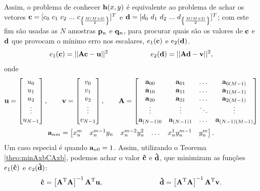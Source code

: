 \begin{theorem}
Assim, o problema de conhecer $\VECTOR{h}(x,y)$ é equivalente ao 
problema de achar os vetores 
$\VECTOR{c}=[c_0~c_1~c_2~...~c_{\left\{ \frac{M(M+3)}{2}\right\}} ]^T$ e
$\VECTOR{d}=[d_0~d_1~d_2~...~d_{\left\{ \frac{M(M+3)}{2}\right\}} ]^T$;
com este fim são usadas as $N$ amostras $\VECTOR{p}_n$ e $\VECTOR{q}_n$,
para  procurar quais são os valores de $\VECTOR{c}$ e $\VECTOR{d}$
que provocam o mínimo erro nos escalares, 
$e_1(\VECTOR{c})$  e $e_2(\VECTOR{d})$.%
\begin{equation}\label{eq:mapeamento:3}
 e_1(\VECTOR{c})=||\MATRIX{A}\VECTOR{c}-\VECTOR{u}||^2 \qquad\qquad\qquad  e_2(\VECTOR{d})=||\MATRIX{A}\VECTOR{d}-\VECTOR{v}||^2,
\end{equation}
onde 
\begin{equation}\label{eq:mapeamento:4}
\VECTOR{u}=
\begin{bmatrix}
u_0 \\
u_1 \\
u_2 \\
\vdots \\
u_{N-1}
\end{bmatrix},
\qquad
\VECTOR{v}=
\begin{bmatrix}
v_0 \\
v_1 \\
v_2 \\
\vdots \\
v_{N-1}
\end{bmatrix},
\qquad
\MATRIX{A}=
\begin{bmatrix}
\VECTOR{a}_{00}     & \VECTOR{a}_{01}     & \dots  & \VECTOR{a}_{0(M-1)} \\
\VECTOR{a}_{10}     & \VECTOR{a}_{11}     & \dots  & \VECTOR{a}_{1(M-1)} \\
\VECTOR{a}_{20}     & \VECTOR{a}_{21}     & \dots  & \VECTOR{a}_{2(M-1)} \\
\vdots              & \vdots              & \ddots & \vdots \\
\VECTOR{a}_{(N-1)0} & \VECTOR{a}_{(N-1)1} & \dots  & \VECTOR{a}_{(N-1)(M-1)}
\end{bmatrix}
\end{equation}
\begin{equation}\label{eq:mapeamento:5}
\VECTOR{a}_{nm}=
\begin{bmatrix}
x^m_n  & x^{m-1}_n y_n  & x^{m-2}_n y^2_n    & \dots  & x^{1}_n y^{m-1}_n &  y^m_n 
\end{bmatrix}.
\end{equation}
Um caso especial é quando $\VECTOR{a}_{n0}=1$.
Assim, utilizando o Teorema \ref{theo:minAxbCAxb},
podemos achar o valor $\VECTOR{\hat{c}}$ e $\VECTOR{\hat{d}}$,
que minimizam as funções  $e_1(\VECTOR{\hat{c}})$  e $e_2(\VECTOR{\hat{d}})$:
\begin{equation}\label{eq:mapeamento:6}
\VECTOR{\hat{c}}=
\left[ \MATRIX{A}^{\transpose}  \MATRIX{A} \right]^{-1}\MATRIX{A}^{\transpose} \VECTOR{u},
\qquad \qquad \qquad \qquad
\VECTOR{\hat{d}}=
\left[ \MATRIX{A}^{\transpose}  \MATRIX{A} \right]^{-1}\MATRIX{A}^{\transpose} \VECTOR{v}.
\end{equation}


\end{theorem}
